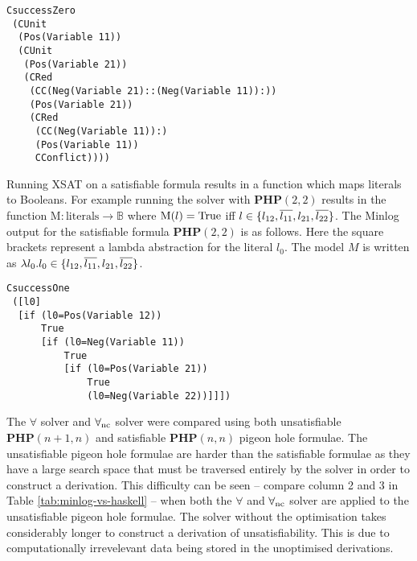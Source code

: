 \begin{lstlisting}[caption = "The derivation produce by XSAT for PHP(2\,1)"]
CsuccessZero
 (CUnit
  (Pos(Variable 11))
  (CUnit
   (Pos(Variable 21))
   (CRed
    (CC(Neg(Variable 21)::(Neg(Variable 11)):))
    (Pos(Variable 21))
    (CRed
     (CC(Neg(Variable 11)):)
     (Pos(Variable 11))
     CConflict))))
\end{lstlisting}

Running XSAT on a satisfiable formula results in a function which 
maps literals to Booleans. For example running the solver with 
$\mathbf{PHP}(2,2)$ results in the function  
	 $\mathrm{M}: \mathrm{literals} \to \mathbb{B}$  where  
$\mathrm{M}(l) = \mathrm{True}$ iff  $l \in \{ l_{12}, \overline{ l_{11}}, l_{21}, \overline{ l_{22}}  \}$.
The Minlog output for the satisfiable formula $\mathbf{PHP}(2,2)$ is as follows. Here the square brackets represent a lambda abstraction for the literal $l_0$. The model $M$ is written as $\lambda l_0 . l_0 \in \{ l_{12}, \overline{l_{11}},l_{21}, \overline{l_{22}} \}$.
\begin{lstlisting}[caption = "The model produced by XSAT for PHP(2\,2)"]
CsuccessOne
 ([l0]
  [if (l0=Pos(Variable 12))
      True 
      [if (l0=Neg(Variable 11)) 
          True 
          [if (l0=Pos(Variable 21)) 
              True 
              (l0=Neg(Variable 22))]]])
\end{lstlisting}
%
%
The $\forall$ solver and $\forall_{\mathrm{nc}}$ solver were compared using both unsatisfiable  $\mathbf{PHP}(n+1, n)$ and satisfiable $\mathbf{PHP}(n,n)$ pigeon hole formulae. The unsatisfiable pigeon hole formulae are harder than the satisfiable formulae as they have a large search space that must be traversed entirely by the solver in order to construct a derivation.
%
This difficulty can be seen -- compare column 2 and 3 in Table 
\ref{tab:minlog-vs-haskell} %
-- when both the $\forall$ and $\forall_{\mathrm{nc}}$ solver are applied to the unsatisfiable pigeon hole formulae. The solver without the optimisation takes considerably longer to construct a derivation of unsatisfiability. This is due to computationally irrevelevant data being stored in the unoptimised derivations. \medskip \\ 
